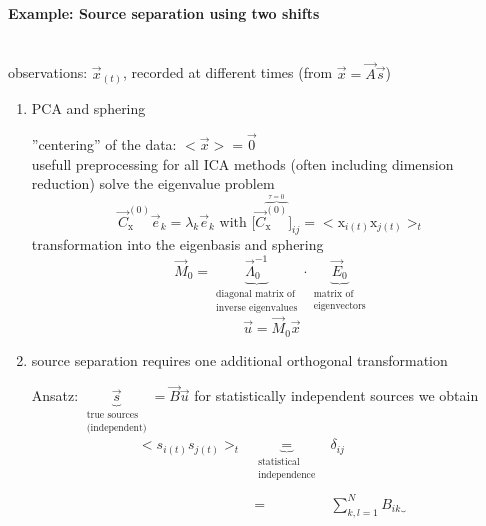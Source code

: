 \paragraph{Example: Source separation using two shifts}\mbox{}\\
observations: $\vec{x}_{(t)}$, recorded at different times (from $\vec{x} = \vec{A} \vec{s}$)
\begin{enumerate}[(1)]
\item PCA and sphering
\begin{itemize}
	\itl ''centering'' of the data: $<\vec{x}> = \vec{0}$ \\
		usefull preprocessing for all ICA methods (often including
		dimension reduction)
	\itl solve the eigenvalue problem
	\begin{equation}
		\vec{C}_{\mathrm{x}}^{(0)} \vec{e}_k = \lambda_k \vec{e}_k
		\text{ with } \big[ \vec{C}_{\mathrm{x}}^{
			\overbrace{ (0) }^{ \tau = 0 } 
			} \big]_{ij}
		= \Big< \mathrm{x}_{i (t)} \mathrm{x}_{j (t)} \Big>_t
	\end{equation}
	\itl transformation into the eigenbasis and sphering
	\begin{equation}\label{sec:sphering}
		\vec{M}_0 = \underbrace{ \vec{\Lambda}_0^{-1} }_{
			\substack{	\text{diagonal matrix of} \\
					\text{inverse eigenvalues}} } \cdot
			\underbrace{ \vec{E}_0 }_{
				\substack{	\text{matrix of} \\
						\text{eigenvectors}} }
	\end{equation}
	\begin{equation}
		\vec{u} = \vec{M}_0 \vec{x}
	\end{equation}	
\end{itemize}
\item source separation requires one additional orthogonal transformation
\begin{itemize}
	\itl Ansatz: $\underbrace{ \vec{s} }_{ 
		\substack{ \text{true sources} \\ \text{(independent)}} }
		= \vec{B} \vec{u}$
	\itl for statistically independent sources we obtain
	\begin{equation}
		\begin{array}{lcl}
		\big< s_{i (t)} s_{j (t)} \big>_t 
		& \underbrace{ = }_{ \substack{	\text{statistical} \\
						\text{independence}} } 
				& \delta_{ij} \\\\
		& = & \sum\limits_{k,l = 1}^N B_{ik} \underbrace{
}
\end{array}
\end{equation}
\end{itemize}
\end{enumerate}

